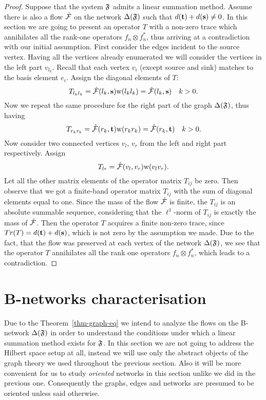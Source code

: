 \documentclass[12pt]{amsart}
\begin{document}
\begin{proof}
      Suppose that the system $\mathfrak{F}$ admits a linear summation method.
      Assume there is also a flow $\mathcal{\hat{F}}$ on the network $\Delta(\mathfrak{F})$ such that $d(\mathbf{t}) + d(\mathbf{s}) \neq 0$.
      In this section we are going to present an operator $T$ with a non-zero trace which annihilates all the rank-one
      operators $f_n \otimes f^*_n$, thus arriving at a contradiction with our initial assumption.
      First consider the edges incident to the source vertex.
      Having all the vertices already enumerated we will consider the vertices in the left part $v_{l_k}$.
      Recall that each vertex $v_i$ (except source and sink) matches to the basis element $e_i$.
      Assign the diagonal elements of $T$:
      \[
        T_{l_k l_k} = \mathcal{\hat{F}}(l_k, \mathbf{s}) \mathrm{w}(l_k l_k) = \mathcal{\hat{F}}(l_k, \mathbf{s}) \quad k > 0.
      \]
      Now we repeat the same procedure for the right part of the graph $\Delta(\mathfrak{F})$, thus having
      \[
        T_{r_k r_k} = \mathcal{\hat{F}}(r_k, \mathbf{t}) \mathrm{w}(r_k r_k) = \mathcal{\hat{F}}(r_k, \mathbf{t}) \quad k > 0.
      \]
      Now consider two connected vertices $v_l$, $v_r$ from the left and right part
        respectively. Assign
      \[
        T_{lr} = \mathcal{\hat{F}}(v_l, v_r) \mathrm{w}(v_l  v_r).
      \]
      Let all the other matrix elements of the operator matrix $T_{ij}$ be zero.
      Then observe that we got a finite-band operator matrix $T_{ij}$ with the sum of diagonal elements
      equal to one.
      Since the mass of the flow $\mathcal{\hat{F}}$ is finite, the $T_{ij}$ is an absolute summable sequence, considering that
        the $\ell^1$-norm of $T_{ij}$ is exactly the mass of $\mathcal{\hat{F}}$.
      Then the operator $T$ acquires a finite non-zero trace, since $Tr(T) = d(\mathbf{t}) + d(\mathbf{s})$, which is not zero
        by the assumption we made.
      Due to the fact, that the flow was preserved at each vertex of the network $\Delta(\mathfrak{F})$,
        we see that the operator $T$ annihilates all the rank one operators $f_n \otimes f^*_n$,
        which leads to a contradiction.
    \end{proof}

  \section{B-networks characterisation}
    Due to the Theorem~\ref{thm-graph-eq} we intend to analyze the flows on the B-network
      $\Delta(\mathfrak{F})$ in order to understand the conditions under which a linear
      summation method exists for $\mathfrak{F}$.
    In this section we are not going to address the Hilbert space setup at all,
      instead we will use only the abstract objects of the graph theory
      we used throughout the previous section.
    Also it will be more convenient for us to study \emph{oriented} networks in this section unlike we
      did in the previous one.
    Consequently the graphs, edges and networks are presumed to be oriented unless said otherwise.
\end{document}
